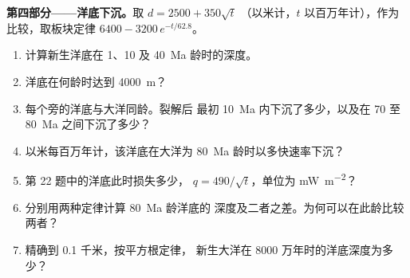 \begin{problem}
\medskip
\noindent\textbf{第四部分——洋底下沉。}取 $d = 2500 + 350\sqrt t$
（以米计，$t$ 以百万年计），作为比较，取板块定律
$6400 - 3200\,e^{-t/62.8}$。
\begin{enumerate}[resume]
  \item 计算新生洋底在 1、10 及
        \qty{40}{Ma} 龄时的深度。
  \item 洋底在何龄时达到 \qty{4000}{m}？
  \item 每个旁的洋底与大洋同龄。裂解后
        最初 \qty{10}{Ma} 内下沉了多少，以及在
        70 至 \qty{80}{Ma} 之间下沉了多少？
  \item 以米每百万年计，该洋底在大洋为
        \qty{80}{Ma} 龄时以多快速率下沉？
  \item 第 22 题中的洋底此时损失多少，
        $q = 490/\sqrt t$，单位为 \unit{mW.m^{-2}}？
  \item 分别用两种定律计算 \qty{80}{Ma} 龄洋底的
        深度及二者之差。为何可以在此龄比较两者？
  \item 精确到 0.1 千米，按平方根定律，
        新生大洋在 8000 万年时的洋底深度为多少？
\end{enumerate}
\end{problem}
